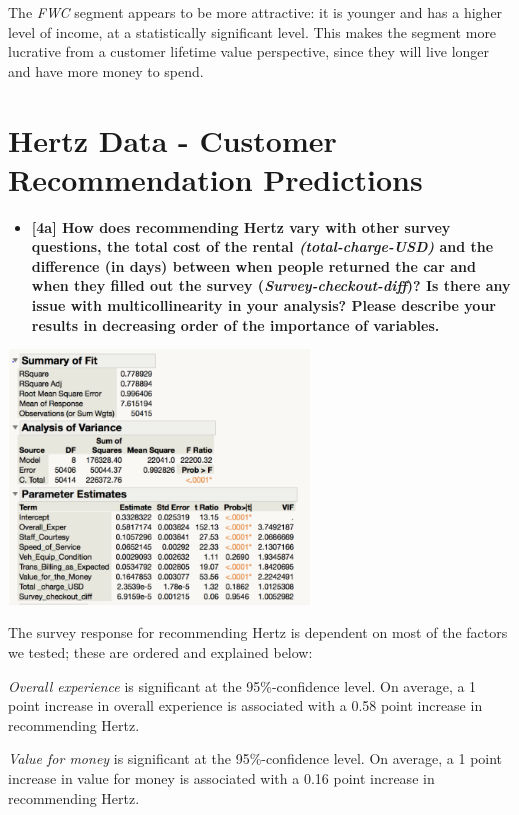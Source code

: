 \documentclass[10pt, oneside,spanish]{article}
\begin{document}
The \textit{FWC} segment appears to be more attractive: it is younger and has a higher level of income, at a statistically significant level. This makes the segment more lucrative from a customer lifetime value perspective, since they will live longer and have more money to spend.

\pagebreak

\section{Hertz Data - Customer Recommendation Predictions} 


\begin{itemize}
\item \textbf{ [4a]  How does recommending Hertz vary with other survey questions, the total cost of the rental \textit{(total-charge-USD)} and the difference (in days) between when people returned the car and when they filled out the survey (\textit{Survey-checkout-diff})? Is there any issue with multicollinearity in your analysis? Please describe your results in decreasing order of the importance of variables.    }
\end{itemize}


\begin{center}
\includegraphics[width=8cm]{4a.PNG}
\end{center}

The survey response for recommending Hertz is dependent on most of the factors we tested; these are ordered and explained below:

\textit{Overall experience} is significant at the 95\%-confidence level. On average, a 1 point increase in overall experience is associated with a 0.58 point increase in recommending Hertz.

\textit{Value for money} is significant at the 95\%-confidence level. On average, a 1 point increase in value for money is associated with a 0.16 point increase in recommending Hertz.
\end{document}
